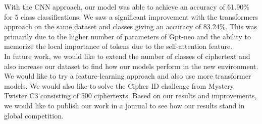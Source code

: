 \documentclass[a4paper]{article}
\begin{document}
With the CNN approach, our model was able to achieve an accuracy of 61.90\% for 5 class classifications. We saw a significant improvement with the transformers approach on the same dataset and classes giving an accuracy of 83.24\%. This was primarily due to the higher number of parameters of Gpt-neo and the ability to memorize the local importance of tokens due to the self-attention feature. 
\\

In future work, we would like to extend the number of classes of ciphertext and also increase our dataset to find how our models perform in the new environment. We would like to try a feature-learning approach and also use more transformer models.  We would also like to solve the Cipher ID challenge from Mystery Twister C3  consisting of 500 ciphertexts. Based on our results and improvements, we would like to publish our work in a journal to see how our results stand in global competition. 


\newpage
\renewcommand{\refname}{REFERENCES}


\end{document}
